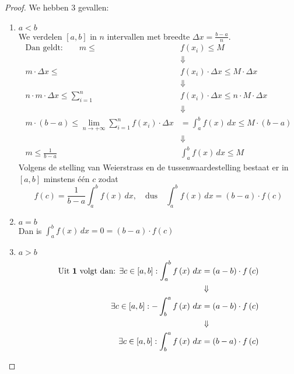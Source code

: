 \documentclass{article}
\theoremstyle{definition}
\begin{document}
\begin{proof}
  We hebben 3 gevallen:
  \begin{enumerate}
    \item $\boxed{a<b}$\\
      We verdelen $\left[a,b\right]$ in $n$ intervallen met breedte $\Delta x = \frac{b-a}{n}$.\\
      \begin{align*}
        \text{Dan geldt:}\qquad m\leq &f\left(x_i\right) \leq M\\
                          &\Downarrow\\
        m \cdot \Delta x\leq &f\left(x_i\right)\cdot \Delta x \leq M\cdot \Delta x\\ 
                          &\Downarrow\\
        n\cdot m \cdot \Delta x\leq \sum_{i=1}^{n}&f\left(x_i\right)\cdot \Delta x \leq n\cdot M\cdot \Delta x\\
                          &\Downarrow\\
        m\cdot \left(b-a\right)\leq \lim_{n\to + \infty}\sum_{i=1}^{n}f\left(x_i\right)\cdot \Delta x &=\displaystyle\int_{a}^{b}f\left(x\right)\,dx\leq M\cdot \left(b-a\right)\\
                          &\Downarrow\\
        m\leq\frac{1}{b-a}&\displaystyle\int_{a}^{b}f\left(x\right)\,dx\leq M
      \end{align*}
      Volgens de stelling van Weierstrass en de tussenwaardestelling bestaat er in $\left[a,b\right]$ minstens één $c$ zodat
      $$f\left(c\right)=\frac{1}{b-a}\displaystyle\int_{a}^{b}f\left(x\right)\,dx, \quad \text{dus} \quad  \displaystyle\int_{a}^{b}f\left(x\right)\,dx=\left(b-a\right)\cdot f\left(c\right)$$
    \item $\boxed{a=b}$\\
      Dan is $\displaystyle\int_{a}^{b}f\left(x\right)\, dx= 0 = \left(b-a\right)\cdot f\left(c\right)$
    \item $\boxed{a>b}$\\
      \begin{align*}
        \text{Uit \textbf{1} volgt dan: } \exists c\in \left[a,b\right]: \displaystyle\int_{a}^{b}f\left(x\right)\,dx &= \left(a-b\right)\cdot f\left(c\right)\\
                                                                                                                       &\Downarrow\\
         \exists c\in \left[a,b\right]: -\displaystyle\int_{b}^{a}f\left(x\right)\,dx &= \left(a-b\right)\cdot f\left(c\right)\\
                                                                                                                       &\Downarrow\\
         \exists c\in \left[a,b\right]: \displaystyle\int_{b}^{a}f\left(x\right)\,dx &= \left(b-a\right)\cdot f\left(c\right)\\
      \end{align*}
  \end{enumerate}
\end{proof}
\end{document}
